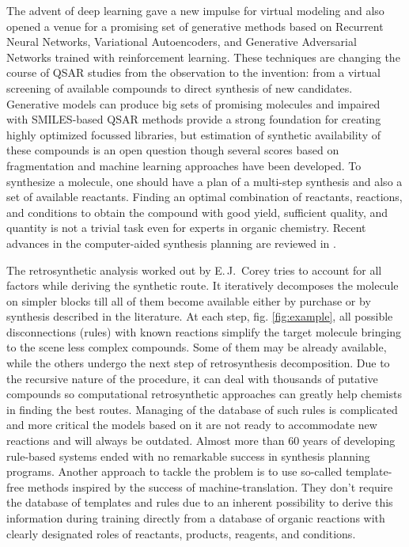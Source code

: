 \documentclass{article}
\begin{document}
The advent of deep learning\cite{ChenDrugDiscovery} gave a new impulse for virtual modeling and also opened a venue for a promising set of generative methods based on Recurrent Neural Networks\cite{ErtlLSTM}, Variational Autoencoders\cite{DuvenaudVAE}, and Generative Adversarial Networks trained with reinforcement learning\cite{ORGAN,OlivecronaReinforcment}. These techniques are changing the course of QSAR studies from the observation to the invention: from a virtual screening of available compounds to direct synthesis of new candidates. Generative models can produce big sets of promising molecules and impaired with SMILES-based QSAR methods\cite{TetkoCNF} provide a strong foundation for creating highly optimized focussed libraries, but estimation of synthetic availability of these compounds is an open question though several scores based on fragmentation\cite{ErtlSaScore} and machine learning\cite{ColeySCScore} approaches have been developed. 
To synthesize a molecule, one should have a plan of a multi-step synthesis and also a set of available reactants. 
Finding an optimal combination of reactants, reactions, and conditions to obtain the compound with good yield, sufficient quality, and quantity is not a trivial task even for experts in organic chemistry. Recent advances in the computer-aided synthesis planning are reviewed in \cite{ColeyReview,EnkvinstReview}. 

The retrosynthetic analysis worked out by E.\,J.~Corey \cite{Corey} tries to account for all factors while deriving the synthetic route. It iteratively decomposes the molecule on simpler blocks till all of them become available either by purchase or by synthesis described in the literature. At each step, fig. \ref{fig:example}, all possible disconnections (rules) with known reactions simplify the target molecule bringing to the scene less complex compounds. Some of them may be already available, while the others undergo the next step of retrosynthesis decomposition. Due to the recursive nature of the procedure, it can deal with thousands of putative compounds so computational retrosynthetic approaches can greatly help chemists in finding the best routes. Managing of the database of such rules is complicated and more critical the models based on it are not ready to accommodate new reactions and will always be outdated. Almost more than 60 years of developing rule-based systems ended with no remarkable success in synthesis planning programs. Another approach to tackle the problem is to use so-called template-free methods inspired by the success of machine-translation. They don't require the database of templates and rules due to an inherent possibility to derive this information during training directly from a database of organic reactions with clearly designated roles of reactants, products, reagents, and conditions.
\end{document}

